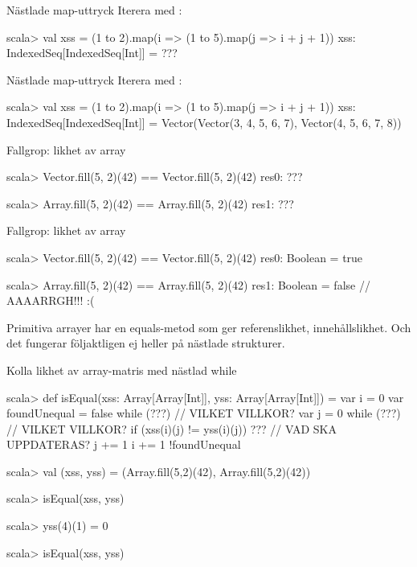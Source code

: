 \begin{Slide}{Nästlade map-uttryck}\SlideFontSmall
Iterera med :\\
\begin{REPL}
scala> val xss = (1 to 2).map(i => (1 to 5).map(j => i + j + 1))
xss: IndexedSeq[IndexedSeq[Int]] =
      ???
\end{REPL}
\end{Slide}

\begin{Slide}{Nästlade map-uttryck}\SlideFontSmall
Iterera med :\\
\begin{REPL}
scala> val xss = (1 to 2).map(i => (1 to 5).map(j => i + j + 1))
xss: IndexedSeq[IndexedSeq[Int]] =
      Vector(Vector(3, 4, 5, 6, 7), Vector(4, 5, 6, 7, 8))
\end{REPL}
\end{Slide}



\ifkompendium\else
\begin{Slide}{Fallgrop: likhet av array}
\begin{REPL}
scala> Vector.fill(5, 2)(42) == Vector.fill(5, 2)(42)
res0: ???

scala> Array.fill(5, 2)(42) == Array.fill(5, 2)(42)
res1: ???
\end{REPL}
\end{Slide}
\fi

\begin{Slide}{Fallgrop: likhet av array}
\begin{REPL}
scala> Vector.fill(5, 2)(42) == Vector.fill(5, 2)(42)
res0: Boolean = true

scala> Array.fill(5, 2)(42) == Array.fill(5, 2)(42)
res1: Boolean = false  // AAAARRGH!!! :(
\end{REPL}
Primitiva arrayer har en equals-metod som ger referenslikhet,  innehållslikhet. Och det fungerar följaktligen ej heller på nästlade strukturer. 
\end{Slide}

\ifkompendium\else
\begin{Slide}{Kolla likhet av array-matris med nästlad while}
\begin{REPL}
scala> def isEqual(xss: Array[Array[Int]], yss: Array[Array[Int]]) = {
         var i = 0
         var foundUnequal = false
         while (???) {                         // VILKET VILLKOR?
           var j = 0
           while (???) {                       // VILKET VILLKOR?
             if (xss(i)(j) != yss(i)(j)) ???   // VAD SKA UPPDATERAS? 
             j += 1
           }
           i += 1
         }
         !foundUnequal
       }

scala> val (xss, yss) = (Array.fill(5,2)(42), Array.fill(5,2)(42))

scala> isEqual(xss, yss)

scala> yss(4)(1) = 0

scala> isEqual(xss, yss)
\end{REPL}
\end{Slide}
\fi


